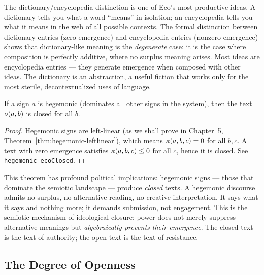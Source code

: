 \begin{interpretation}
The dictionary/encyclopedia distinction is one of Eco's most productive
ideas. A dictionary tells you what a word ``means'' in isolation; an
encyclopedia tells you what it means in the web of all possible
contexts. The formal distinction between dictionary entries (zero
emergence) and encyclopedia entries (nonzero emergence) shows that
dictionary-like meaning is the \emph{degenerate} case: it is the case
where composition is perfectly additive, where no surplus meaning
arises. Most ideas are encyclopedia entries --- they generate emergence
when composed with other ideas. The dictionary is an abstraction, a
useful fiction that works only for the most sterile, decontextualized
uses of language.
\end{interpretation}

\begin{theorem}
\label{thm:hegemonic-closed}
If a sign $a$ is hegemonic (dominates all other signs in the system),
then the text $\circ(a, b)$ is closed for all $b$.
\end{theorem}

\begin{proof}
Hegemonic signs are left-linear (as we shall prove in
Chapter~5, Theorem~\ref{thm:hegemonic-leftlinear}), which means
$\kappa(a, b, c) = 0$ for all $b, c$. A text with zero emergence
satisfies $\kappa(a,b,c) \leq 0$ for all $c$, hence it is closed.
See \texttt{hegemonic\_ecoClosed}.
\end{proof}

\begin{interpretation}
This theorem has profound political implications: hegemonic signs ---
those that dominate the semiotic landscape --- produce \emph{closed}
texts. A hegemonic discourse admits no surplus, no alternative reading,
no creative interpretation. It says what it says and nothing more; it
demands submission, not engagement. This is the semiotic mechanism of
ideological closure: power does not merely suppress alternative meanings
but \emph{algebraically prevents their emergence}. The closed text is
the text of authority; the open text is the text of resistance.
\end{interpretation}

\subsection{The Degree of Openness}

